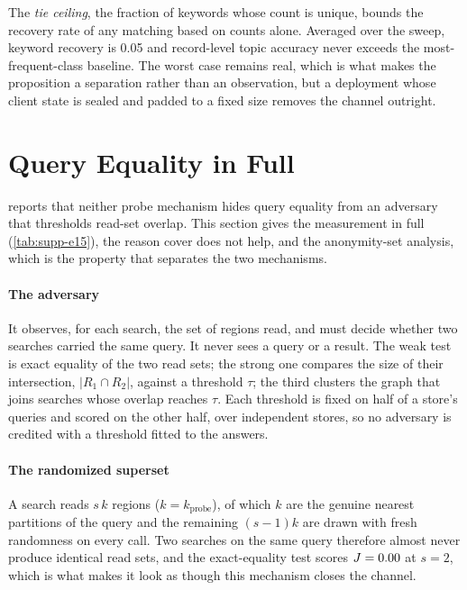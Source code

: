 \documentclass[10pt,journal,compsoc]{IEEEtran}
\begin{document}
The \emph{tie ceiling}, the fraction of keywords whose count is unique, bounds the recovery rate of
any matching based on counts alone. Averaged over the sweep, keyword recovery is 0.05 and
record-level topic accuracy never exceeds the most-frequent-class baseline. The worst case remains
real, which is what makes the proposition a separation rather than an observation, but a deployment
whose client state is sealed and padded to a fixed size removes the channel outright.

\section{Query Equality in Full}
\label{supp:query}

 reports that neither probe mechanism hides query equality from an adversary that
thresholds read-set overlap. This section gives the measurement in full (\cref{tab:supp-e15}), the
reason cover does not help, and the anonymity-set analysis, which is the property that separates
the two mechanisms.



\paragraph{The adversary} It observes, for each search, the set of regions read, and must decide
whether two searches carried the same query. It never sees a query or a result. The weak test is
exact equality of the two read sets; the strong one compares the size of their intersection,
$|R_1 \cap R_2|$, against a threshold $\tau$; the third clusters the graph that joins searches
whose overlap reaches $\tau$. Each threshold is fixed on half of a store's queries and scored on
the other half, over \REfifteenRepeats{} independent stores, so no adversary is credited with a
threshold fitted to the answers.

\paragraph{The randomized superset} A search reads $s\,k$ regions ($k = k_{\mathrm{probe}}$), of
which $k$ are the genuine nearest partitions of the query and the remaining $(s-1)k$ are drawn with
fresh randomness on every call. Two searches on the same query therefore almost never produce
identical read sets, and the exact-equality test scores $J = 0.00$ at $s = 2$,
which is what makes it look as though this mechanism closes the channel.
\end{document}
